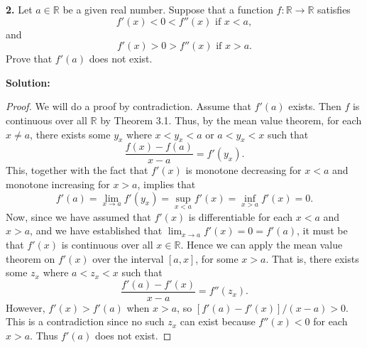 \documentclass[11pt]{article}
\begin{document}
{\bf 2.} Let $a \in \mathbb{R}$ be a given real number. Suppose that a
function $f: \mathbb{R}\rightarrow \mathbb{R}$ satisfies
\[ f'(x) < 0 < f''(x) \text{ if } x < a,\]
and 
\[ f'(x) > 0 > f''(x) \text{ if } x > a. \]
Prove that $f'(a)$ does not exist.

{\bf Solution:}
\begin{proof}
We will do a proof by contradiction. Assume that $f'(a)$ exists. Then $f$ is
continuous over all $\mathbb{R}$ by Theorem 3.1. Thus, by the mean value
theorem, for each $x\neq a$, there exists some $y_{x}$ where $x < y_{x} < a$ or
$a < y_{x} < x$ such that 
\[ \frac{f(x) - f(a)}{x-a} = f'(y_{x}). \]
This, together with the fact that $f'(x)$ is monotone decreasing for $x < a$ and
monotone increasing for $x > a$, implies that 
\[ f'(a) = \lim_{x\rightarrow a}f'(y_{x}) = \sup_{x < a}f'(x) = \inf_{x >
a}f'(x) = 0.\]
Now, since we have assumed that $f'(x)$ is differentiable for each $x < a$ and
$x > a$, and we have established that $\lim_{x\rightarrow a}f'(x) = 0 = f'(a)$,
it must be that $f'(x)$ is continuous over all $x \in \mathbb{R}$. Hence we can
apply the mean value theorem on $f'(x)$ over the interval $[a,x]$, for some $x >
a$. That is, there exists some $z_{x}$ where $a < z_{x} < x$ such that 
\[ \frac{f'(a) - f'(x)}{x - a} = f''(z_{x}). \]
However, $f'(x) > f'(a)$ when $x > a$, so $[f'(a) - f'(x)] / (x - a) > 0$. This
is a contradiction since no such $z_{x}$ can exist because $f''(x) < 0$ for each
$x > a$. Thus $f'(a)$ does not exist.
\end{proof}
 
\end{document}
